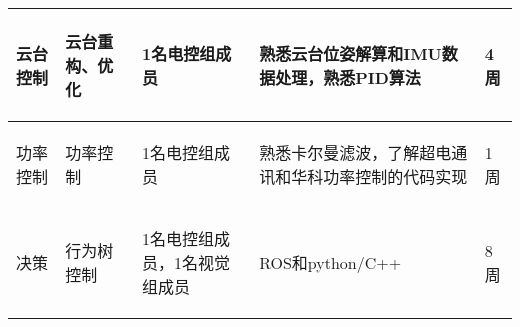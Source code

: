 \begin{longtable}{ p{2cm} | p{3cm} | p{3cm} | p{4.8cm} | p{2cm} |}
    \hline
    
        \begin{center}
            云台控制
        \end{center} &
        \begin{center}
            云台重构、优化
        \end{center} &
        \begin{center}
            1名电控组成员
        \end{center} &
        \begin{center}
            熟悉云台位姿解算和IMU数据处理，熟悉PID算法
        \end{center} &
        \begin{center}
            4周
        \end{center}\\

    \hline
    
        \begin{center}
            功率控制
        \end{center} &
        \begin{center}
            功率控制
        \end{center} &
        \begin{center}
            1名电控组成员
        \end{center} &
        \begin{center}
            熟悉卡尔曼滤波，了解超电通讯和华科功率控制的代码实现
        \end{center} &
        \begin{center}
            1周
        \end{center} \\
        
    \hline
    
        \begin{center}
            决策
        \end{center} &
        \begin{center}
            行为树控制
        \end{center} &
        \begin{center}
            1名电控组成员，1名视觉组成员
        \end{center} &
        \begin{center}
            ROS和python/C++
        \end{center} &
        \begin{center}
            8周
        \end{center} \\


\end{longtable}

